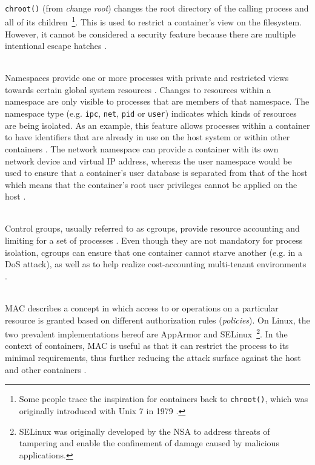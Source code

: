 \begin{description}[format={\storedescriptionlabel}]
  \item[Chroots\label{itm:chroots}]
  \hfill \\
  \texttt{chroot()} (from \textit{ch}ange \textit{root}) changes the root directory of the calling process and all of its children~\footnote{Some people trace the inspiration for containers back to \texttt{chroot()}, which was originally introduced with Unix 7 in 1979 \cite[p.~82]{bernstein2014containers}.}. This is used to restrict a container's view on the filesystem. However, it cannot be considered a security feature because there are multiple intentional escape hatches \cite[p.~3]{eder2016hypervisor}.

  \item[Namespaces]
  \hfill \\
  Namespaces provide one or more processes with private and restricted views towards certain global system resources \cite[p.~387]{morabito2015hypervisors}. Changes to resources within a namespace are only visible to processes that are members of that namespace. The namespace type (e.g. \texttt{ipc}, \texttt{net}, \texttt{pid} or \texttt{user}) indicates which kinds of resources are being isolated. As an example, this feature allows processes within a container to have identifiers that are already in use on the host system or within other containers \cite[p.~3] {eder2016hypervisor}. The network namespace can provide a container with its own network device and virtual \acs{IP} address, whereas the user namespace would be used to ensure that a container's user database is separated from that of the host which means that the container's root user privileges cannot be applied on the host \cite[p.~1]{merkel2014docker}.

  \item[Control groups]
  \hfill \\
  Control groups, usually referred to as cgroups, provide resource accounting and limiting for a set of processes  \cite[p.~387]{morabito2015hypervisors} \cite[p.~1]{merkel2014docker}. Even though they are not mandatory for process isolation, cgroups can ensure that one container cannot starve another (e.g. in a \acs{DoS} attack), as well as to help realize cost-accounting multi-tenant environments \cite[p.~4]{eder2016hypervisor}.

  \item[\acl{MAC}]
  \hfill \\
  \ac{MAC} describes a concept in which access to or operations on a particular resource is granted based on different authorization rules (\textit{policies}). On Linux, the two prevalent implementations hereof are AppArmor and \acs{SELinux}~\footnote{\ac{SELinux} was originally developed by the \acs{NSA} to address threats of tampering and enable the confinement of damage caused by malicious applications.}. In the context of containers, \ac{MAC} is useful as that it can restrict the process to its minimal requirements, thus further reducing the attack surface against the host and other containers \cite[p.~4]{eder2016hypervisor}.
\end{description}



